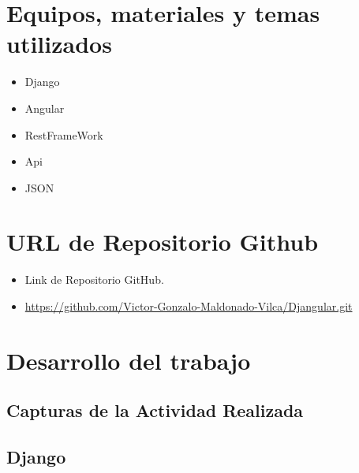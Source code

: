 \documentclass{article}
\begin{document}
		
	\section{Equipos, materiales y temas utilizados}
  \begin{itemize}
    \item Django
    \item Angular
    \item RestFrameWork
    \item Api
    \item JSON
  \end{itemize}
 

  \section{URL de Repositorio Github}
  \begin{itemize}
    \item Link de Repositorio GitHub.
    \item \url{https://github.com/Victor-Gonzalo-Maldonado-Vilca/Djangular.git}
  \end{itemize}


  \section{Desarrollo del trabajo}
  \subsection{Capturas de la Actividad Realizada}
  
  
  \subsection{Django}
\end{document}

